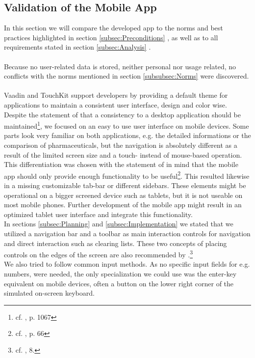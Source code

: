 \subsection{Validation of the Mobile App}
\label{subsec:Validation}
In this section we will compare the developed app to the norms and best practices highlighted in section \ref{subsec:Preconditions} , as well as to all requirements stated in section \ref{subsec:Analysis} .
\\
\\
Because no user-related data is stored, neither personal nor usage related, no conflicts with the norms mentioned in section \ref{subsubsec:Norms}  were discovered.
\\
\\
Vaadin and TouchKit support developers by providing a default theme for applications to maintain a consistent user interface, design and color wise. Despite the statement of \cite{Wessels.2011} that a consistency to a desktop application should be maintained\footnote{cf. \cite{Wessels.2011}, p. 1067}, we focused on an easy to use user interface on mobile devices. Some parts look very familiar on both applications, e.g. the detailed informations or the comparison of pharmaceuticals, but the navigation is absolutely different as a result of the limited screen size and a touch- instead of mouse-based operation. This differentiation was chosen with the statement of \cite{Lica.2010} in mind that the mobile app should only provide enough functionality to be useful\footnote{cf. \cite{Lica.2010}, p. 66}. This resulted likewise in a missing customizable tab-bar or different sidebars. These elements might be operational on a bigger screened device such as tablets, but it is not useable on most mobile phones. Further development of the mobile app might result in an optimized tablet user interface and integrate this functionality.
\\
In sections \ref{subsec:Planning}  and \ref{subsec:Implementation}  we stated that we utilized a navigation bar and a toolbar as main interaction controls for navigation and direct interaction such as clearing lists. These two concepts of placing controls on the edges of the screen are also recommended by \cite{WorldWideWebConsortium.2008}.\footnote{cf. \cite{WorldWideWebConsortium.2008}, 8.}
\\
We also tried to follow common input methods. As no specific input fields for e.g. numbers, were needed, the only specialization we could use was the enter-key equivalent on mobile devices, often a button on the lower right corner of the simulated on-screen keyboard.
